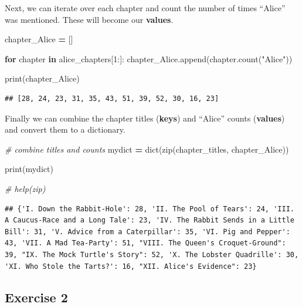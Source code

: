 \documentclass[
]{book}
\newenvironment{Shaded}{\begin{snugshade}}{\end{snugshade}}
\newcommand{\BuiltInTok}[1]{#1}
\newcommand{\CommentTok}[1]{\textcolor[rgb]{0.56,0.35,0.01}{\textit{#1}}}
\newcommand{\ControlFlowTok}[1]{\textcolor[rgb]{0.13,0.29,0.53}{\textbf{#1}}}
\newcommand{\DecValTok}[1]{\textcolor[rgb]{0.00,0.00,0.81}{#1}}
\newcommand{\KeywordTok}[1]{\textcolor[rgb]{0.13,0.29,0.53}{\textbf{#1}}}
\newcommand{\NormalTok}[1]{#1}
\newcommand{\OperatorTok}[1]{\textcolor[rgb]{0.81,0.36,0.00}{\textbf{#1}}}
\newcommand{\StringTok}[1]{\textcolor[rgb]{0.31,0.60,0.02}{#1}}
\begin{document}
Next, we can iterate over each chapter and count the number of times ``Alice'' was mentioned. These will become our \textbf{values}.

\begin{Shaded}
\begin{Highlighting}[]
\NormalTok{chapter\_Alice }\OperatorTok{=}\NormalTok{ []}

\ControlFlowTok{for}\NormalTok{ chapter }\KeywordTok{in}\NormalTok{ alice\_chapters[}\DecValTok{1}\NormalTok{:]:}
\NormalTok{    chapter\_Alice.append(chapter.count(}\StringTok{"Alice"}\NormalTok{))}

\BuiltInTok{print}\NormalTok{(chapter\_Alice)  }
\end{Highlighting}
\end{Shaded}

\begin{verbatim}
## [28, 24, 23, 31, 35, 43, 51, 39, 52, 30, 16, 23]
\end{verbatim}

Finally we can combine the chapter titles (\textbf{keys}) and ``Alice'' counts (\textbf{values}) and convert them to a dictionary.

\begin{Shaded}
\begin{Highlighting}[]
\CommentTok{\# combine titles and counts}
\NormalTok{mydict }\OperatorTok{=} \BuiltInTok{dict}\NormalTok{(}\BuiltInTok{zip}\NormalTok{(chapter\_titles, chapter\_Alice))}

\BuiltInTok{print}\NormalTok{(mydict)}

\CommentTok{\# help(zip)         }
\end{Highlighting}
\end{Shaded}

\begin{verbatim}
## {'I. Down the Rabbit-Hole': 28, 'II. The Pool of Tears': 24, 'III. A Caucus-Race and a Long Tale': 23, 'IV. The Rabbit Sends in a Little Bill': 31, 'V. Advice from a Caterpillar': 35, 'VI. Pig and Pepper': 43, 'VII. A Mad Tea-Party': 51, "VIII. The Queen's Croquet-Ground": 39, "IX. The Mock Turtle's Story": 52, 'X. The Lobster Quadrille': 30, 'XI. Who Stole the Tarts?': 16, "XII. Alice's Evidence": 23}
\end{verbatim}

\hypertarget{exercise-2-3}{%
\subsection{Exercise 2}\label{exercise-2-3}}
\end{document}
